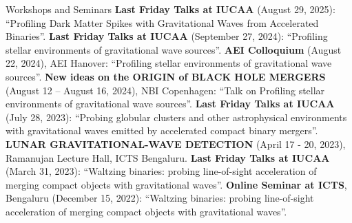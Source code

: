\begin{rubric}{Workshops and Seminars}
\entry*[] \textbf{Last Friday Talks at IUCAA} (August 29, 2025): ``Profiling Dark Matter Spikes with Gravitational Waves from Accelerated Binaries''.
%
\entry*[] \textbf{Last Friday Talks at IUCAA} (September 27, 2024): ``Profiling stellar environments of gravitational wave sources''.
%
\entry*[] \textbf{AEI Colloquium} (August 22, 2024), AEI Hanover: ``Profiling stellar environments of gravitational wave sources''.
%
\entry*[] \textbf{New ideas on the ORIGIN of BLACK HOLE MERGERS} (August 12 – August 16, 2024), NBI Copenhagen: ``Talk on Profiling stellar environments of gravitational wave sources''.
%
\entry*[] \textbf{Last Friday Talks at IUCAA} (July 28, 2023): ``Probing globular clusters and other astrophysical environments with gravitational waves emitted by accelerated compact binary mergers''.
%
\entry*[] \textbf{LUNAR GRAVITATIONAL-WAVE DETECTION} (April 17 - 20, 2023), Ramanujan Lecture Hall, ICTS Bengaluru.
%
\entry*[] \textbf{Last Friday Talks at IUCAA} (March 31, 2023): ``Waltzing binaries: probing line-of-sight acceleration of merging compact objects with gravitational waves''.
%
\entry*[] \textbf{Online Seminar at ICTS}, Bengaluru (December 15, 2022): ``Waltzing binaries: probing line-of-sight acceleration of merging compact objects with gravitational waves''.

\end{rubric}